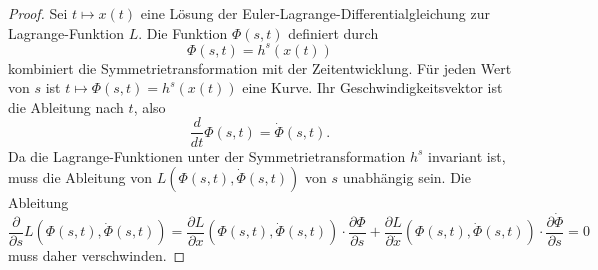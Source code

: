 \begin{proof}
Sei $t\mapsto x(t)$ eine Lösung der Euler-Lagrange-Differentialgleichung
zur Lagrange-Funktion $L$.
Die Funktion $\Phi(s,t)$ definiert durch
\[
\Phi(s,t) = h^s(x(t))
\]
kombiniert die Symmetrietransformation mit der Zeitentwicklung.
Für jeden Wert von $s$ ist $t\mapsto \Phi(s,t)=h^s(x(t))$ eine 
Kurve.
Ihr Geschwindigkeitsvektor ist die Ableitung nach $t$, also
\[
\frac{d}{dt} \Phi(s,t)
=
\dot{\Phi}(s,t).
\]
Da die Lagrange-Funktionen unter der Symmetrietransformation $h^s$ 
invariant ist, muss die Ableitung von $L(\Phi(s,t), \dot{\Phi}(s,t))$
von $s$ unabhängig sein.
Die Ableitung
\begin{equation}
\frac{\partial}{\partial s} L(\Phi(s,t), \dot{\Phi}(s,t))
=
\frac{\partial L}{\partial x}(\Phi(s,t),\dot{\Phi}(s,t))
\cdot
\frac{\partial \Phi}{\partial s}
+
\frac{\partial L}{\partial \dot{x}}(\Phi(s,t),\dot{\Phi}(s,t))
\cdot
\frac{\partial \dot{\Phi}}{\partial s}
=0
\label{buch:symmetrioen:noether:eqn:sabl}
\end{equation}
muss daher verschwinden.


\end{proof}
